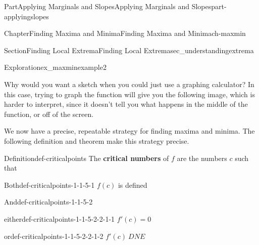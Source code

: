\documentclass{tufte-book}
\newcommand{\terminology}[1]{\textbf{#1}}
\numberwithin{equation}{chapter}
\begin{document}
\begin{partptx}{Part}{Applying Marginals and Slopes}{}{Applying Marginals and Slopes}{}{}{part-applyingslopes}
\begin{chapterptx}{Chapter}{Finding Maxima and Minima}{}{Finding Maxima and Minima}{}{}{ch-maxmin}
\begin{sectionptx}{Section}{Finding Local Extrema}{}{Finding Local Extrema}{}{}{sec_understandingextrema}
\begin{exploration}{Exploration}{}{ex_maxminexample2}
\begin{enumerate}[font=\bfseries,label=(\alph*),ref=\alph*]
\begin{image}{0.25}{0.5}{0.25}{}
{
}%
\end{image}%
%
\par
Why would you want a sketch when you could just use a graphing calculator? In this case, trying to graph the function will give you the following image, which is harder to interpret, since it doesn't tell you what happens in the middle of the function, or off of the screen. \begin{image}{0}{1}{0}{}%
%
\end{image}%
%
\end{enumerate}%
\end{exploration}%
We now have a precise, repeatable strategy for finding maxima and minima. The following definition and theorem make this strategy precise.%
\begin{definition}{Definition}{}{def-criticalpoints}%
The \terminology{critical numbers} of \(f\) are the numbers \(c\) such that \(\)%
\begin{descriptionlist}
\begin{dlimedium}{Both}{def-criticalpoints-1-1-5-1}%
\(f(c)\) is defined%
\end{dlimedium}%
\begin{dlimedium}{And}{def-criticalpoints-1-1-5-2}%
%
\begin{descriptionlist}
\begin{dlimedium}{either}{def-criticalpoints-1-1-5-2-2-1-1}%
 \(f'(c) = 0\)\end{dlimedium}%
\begin{dlimedium}{or}{def-criticalpoints-1-1-5-2-2-1-2}%
 \(f'(c)\ DNE\)\end{dlimedium}%
\end{descriptionlist}

\end{dlimedium}
\end{descriptionlist}
\end{definition}
\end{sectionptx}
\end{chapterptx}
\end{partptx}
\end{document}
